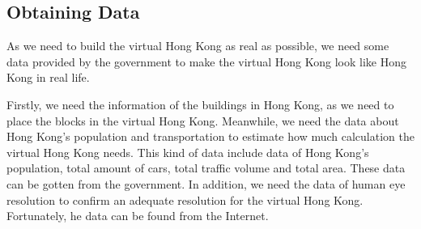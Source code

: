 \documentclass[12pt]{article}
\theoremstyle{definition}
\theoremstyle{remark}
\numberwithin{equation}{section}
\begin{document}
	\subsection{Obtaining Data}
		As we need to build the virtual Hong Kong as real as possible, we need some data provided by the government to make the virtual Hong Kong look like Hong Kong in real life.
		
		Firstly, we need the information of the buildings in Hong Kong, as we need to place the blocks in the virtual Hong Kong. Meanwhile, we need the data about Hong Kong’s population and transportation to estimate how much calculation the virtual Hong Kong needs. This kind of data include data of Hong Kong’s population, total amount of cars, total traffic volume and total area. These data can be gotten from the government. In addition, we need the data of human eye resolution to confirm an adequate resolution for the virtual Hong Kong. Fortunately, he data can be found from the Internet.
		
\end{document}
